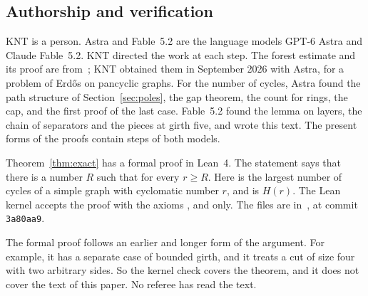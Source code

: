 \subsection{Authorship and verification}\label{sec:status}

KNT is a person. Astra and Fable~5.2 are the language models GPT-6 Astra and Claude Fable~5.2.
KNT directed the work at each step. The forest estimate and its proof are from~\cite{KNT}; KNT
obtained them in September 2026 with Astra, for a problem of Erd\H{o}s on pancyclic graphs. For
the number of cycles, Astra found the path structure of
Section~\ref{sec:poles}, the gap theorem, the count for rings, the cap, and the first proof of
the last case. Fable~5.2 found the lemma on layers, the chain of separators and the pieces at
girth five, and wrote this text. The present forms of the proofs contain steps of both models.

Theorem~\ref{thm:exact} has a formal proof in Lean~4. The statement
 says that there is a number $R$ such that
 for every $r\ge R$. Here  is the largest number
of cycles of a simple graph with cyclomatic number $r$, and  is $H(r)$. The Lean
kernel accepts the proof with the axioms ,  and
 only. The files are in~\cite{Repo}, at commit \texttt{3a80aa9}.

The formal proof follows an earlier and longer form of the argument. For example, it has a
separate case of bounded girth, and it treats a cut of size four with two arbitrary sides. So
the kernel check covers the theorem, and it does not cover the text of this paper. No referee
has read the text.
